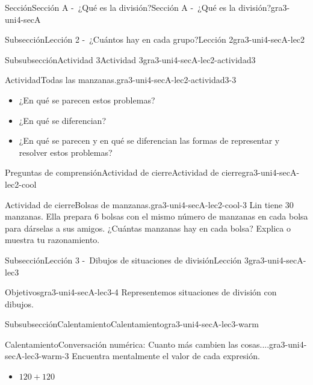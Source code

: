 \documentclass[twoside,10pt,]{article}
\begin{document}
\begin{sectionptx}{Sección}{Sección A -~¿Qué es la división?}{}{Sección A -~¿Qué es la división?}{}{}{gra3-uni4-secA}
\begin{subsectionptx}{Subsección}{Lección 2 -~¿Cuántos hay en cada grupo?}{}{Lección 2}{}{}{gra3-uni4-secA-lec2}
\begin{subsubsectionptx}{Subsubsección}{Actividad 3}{}{Actividad 3}{}{}{gra3-uni4-secA-lec2-actividad3}
\begin{activity}{Actividad}{Todas las manzanas.}{gra3-uni4-secA-lec2-actividad3-3}
\begin{itemize}[label=\textbullet]
\item{}¿En qué se parecen estos problemas?%
\item{}¿En qué se diferencian?%
\item{}¿En qué se parecen y en qué se diferencian las formas de representar y resolver estos problemas?%
\end{itemize}
%
\end{activity}%
\end{subsubsectionptx}
%
%
\typeout{************************************************}
\typeout{************************************************}
%
\begin{reading-questions-subsubsection}{Preguntas de comprensión}{Actividad de cierre}{}{Actividad de cierre}{}{}{gra3-uni4-secA-lec2-cool}
\begin{project}{Actividad de cierre}{Bolsas de manzanas.}{gra3-uni4-secA-lec2-cool-3}%
Lin tiene 30 manzanas. Ella prepara 6 bolsas con el mismo número de manzanas en cada bolsa para dárselas a sus amigos. ¿Cuántas manzanas hay en cada bolsa? Explica o muestra tu razonamiento.%
\end{project}%
\end{reading-questions-subsubsection}
\end{subsectionptx}
%
%
\typeout{************************************************}
\typeout{************************************************}
%
\begin{subsectionptx}{Subsección}{Lección 3 -~Dibujos de situaciones de división}{}{Lección 3}{}{}{gra3-uni4-secA-lec3}
\begin{objectives}{Objetivos}{gra3-uni4-secA-lec3-4}
Representemos situaciones de división con dibujos.%
\end{objectives}
%
%
\typeout{************************************************}
\typeout{************************************************}
%
\begin{subsubsectionptx}{Subsubsección}{Calentamiento}{}{Calentamiento}{}{}{gra3-uni4-secA-lec3-warm}
\begin{exploration}{Calentamiento}{Conversación numérica: Cuanto más cambien las cosas....}{gra3-uni4-secA-lec3-warm-3}%
Encuentra mentalmente el valor de cada expresión.%
\par
%
\begin{itemize}[label=\textbullet]
\item{}\(\displaystyle 120 + 120\)%

\end{itemize}
\end{exploration}
\end{subsubsectionptx}
\end{subsectionptx}
\end{sectionptx}
\end{document}

